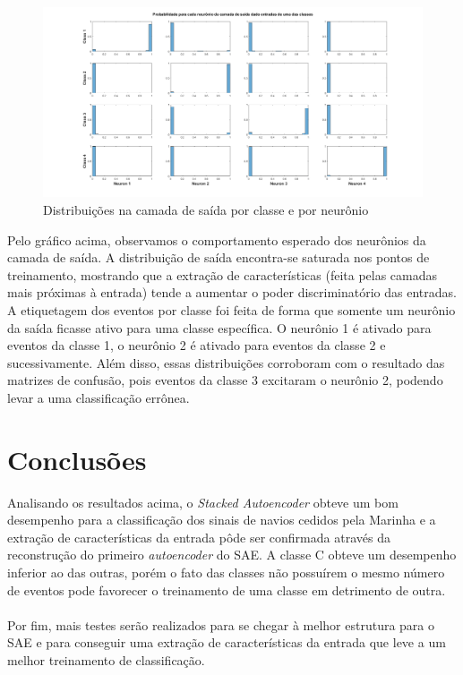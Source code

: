 \documentclass[]{report}
\begin{document}
	\begin{figure}[H]
		\hspace{-2.75cm}\includegraphics[width=1.4\linewidth]{picts/outputs_16x16}
		\vspace{-1.2cm}\caption{Distribuições na camada de saída por classe e por neurônio}
		\label{fig:outputs_16x16}
	\end{figure}
	\hspace{-0.5cm}Pelo gráfico acima, observamos o comportamento esperado dos neurônios da camada de saída. A distribuição de saída encontra-se saturada nos pontos de treinamento, mostrando que a extração de características (feita pelas camadas mais próximas à entrada) tende a aumentar o poder discriminatório das entradas. \\
	 A etiquetagem dos eventos por classe foi feita de forma que somente um neurônio da saída ficasse ativo para uma classe específica. O neurônio 1 é ativado para eventos da classe 1, o neurônio 2 é ativado para eventos da classe 2 e sucessivamente. Além disso, essas distribuições corroboram com o resultado das matrizes de confusão, pois eventos da classe 3 excitaram o neurônio 2, podendo levar a uma classificação errônea.
	
	\section*{Conclusões}
	Analisando os resultados acima, o \textit{Stacked Autoencoder} obteve um bom desempenho para a classificação dos sinais de navios cedidos pela Marinha e a extração de características da entrada pôde ser confirmada através da reconstrução do primeiro \textit{autoencoder} do SAE. A classe C obteve um desempenho inferior ao das outras, porém o fato das classes não possuírem o mesmo número de eventos pode favorecer o treinamento de uma classe em detrimento de outra.\\\\
	Por fim, mais testes serão realizados para se chegar à melhor estrutura para o SAE e para conseguir uma extração de características da entrada que leve a um melhor treinamento de classificação.
	
\end{document}
